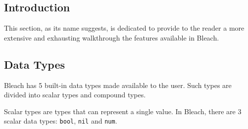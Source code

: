 \subsection{Introduction}
This section, as its name suggests, is dedicated to provide to the reader a more extensive and exhausting walkthrough the features available in Bleach. 

\subsection{Data Types}
Bleach has 5 built-in data types made available to the user. Such types are divided into scalar types  and compound types.

Scalar types are types that can represent a single value. In Bleach, there are 3 scalar data types: \texttt{bool}, \texttt{nil} and \texttt{num}.
